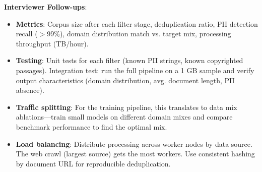 \textbf{Interviewer Follow-ups}:
\begin{itemize}[leftmargin=*]
    \item \textbf{Metrics}: Corpus size after each filter stage, deduplication ratio, PII detection recall ($>$99\%), domain distribution match vs. target mix, processing throughput (TB/hour).
    \item \textbf{Testing}: Unit tests for each filter (known PII strings, known copyrighted passages). Integration test: run the full pipeline on a 1 GB sample and verify output characteristics (domain distribution, avg. document length, PII absence).
    \item \textbf{Traffic splitting}: For the training pipeline, this translates to data mix ablations---train small models on different domain mixes and compare benchmark performance to find the optimal mix.
    \item \textbf{Load balancing}: Distribute processing across worker nodes by data source. The web crawl (largest source) gets the most workers. Use consistent hashing by document URL for reproducible deduplication.
\end{itemize}

